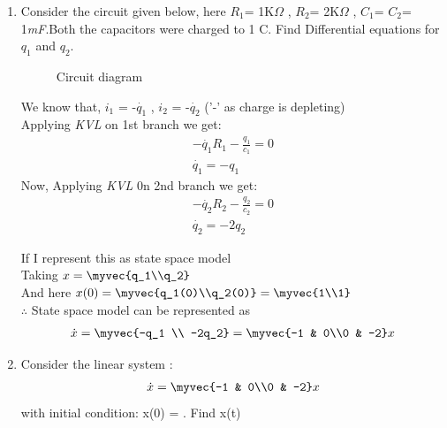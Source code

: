\begin{enumerate}[label=\thesubsection.\arabic*.,ref=\thesubsection.\theenumi]

\item Consider the circuit given below, here $R_1$= 1K$\Omega$ , $R_2$= 2K$\Omega$ , $C_1$= $C_2$= 1\emph{mF}.Both the capacitors were charged to 1 C. Find Differential equations for $q_1$ and $q_2$.


\begin{figure}[!ht]
    \begin{center}
		
		\resizebox{\columnwidth}{!}{}
	\end{center}
\caption{Circuit diagram}
\label{fig:circuit_diagram}
\end{figure}

\solution We know that, $i_1$ = -$\dot{q_1}$ , $i_2$ = -$\dot{q_2}$   ('-' as charge is depleting)\\
Applying \emph{KVL} on 1st branch we get:
\begin{align}
    -\dot{q_1}R_1 - \frac{q_1}{c_1} = 0\\
    \dot{q_1} = -q_1
\end{align}
Now, Applying \emph{KVL} 0n 2nd branch we get:
\begin{align}
    -\dot{q_2}R_2 - \frac{q_2}{c_2} = 0\\
    \dot{q_2} = -2q_2
\end{align}

If I represent this as state space model\\
Taking $x = \myvec{q_1\\q_2}$\\
And here $x(0) = \myvec{q_1(0)\\q_2(0)} = \myvec{1\\1}$\\
$\therefore$ State space model can be represented as \\
\begin{align}
    \dot{x} = \myvec{-q_1 \\ -2q_2} = \myvec{-1 & 0\\0 & -2}x
\end{align}
\newline


\item  Consider the linear system :
\begin{align}
    \dot{x} = \myvec{-1 & 0\\0 & -2}x
\end{align}
with initial condition:  
x(0) = . Find x(t)



\end{enumerate}
